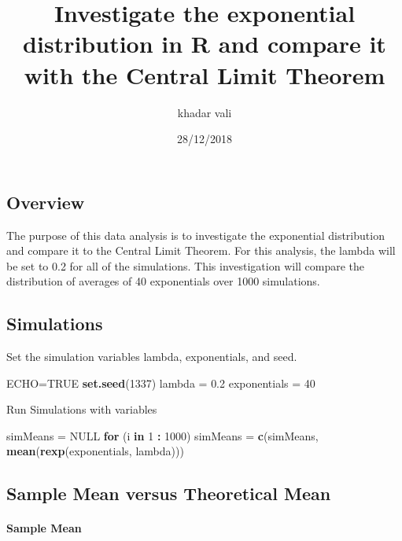 \documentclass[]{article}
\title{Investigate the exponential distribution in R and compare it with the
Central Limit Theorem}
\author{khadar vali}
\date{28/12/2018}
\newenvironment{Shaded}{\begin{snugshade}}{\end{snugshade}}
\newcommand{\KeywordTok}[1]{\textcolor[rgb]{0.13,0.29,0.53}{\textbf{#1}}}
\newcommand{\DecValTok}[1]{\textcolor[rgb]{0.00,0.00,0.81}{#1}}
\newcommand{\FloatTok}[1]{\textcolor[rgb]{0.00,0.00,0.81}{#1}}
\newcommand{\StringTok}[1]{\textcolor[rgb]{0.31,0.60,0.02}{#1}}
\newcommand{\OtherTok}[1]{\textcolor[rgb]{0.56,0.35,0.01}{#1}}
\newcommand{\ControlFlowTok}[1]{\textcolor[rgb]{0.13,0.29,0.53}{\textbf{#1}}}
\newcommand{\OperatorTok}[1]{\textcolor[rgb]{0.81,0.36,0.00}{\textbf{#1}}}
\newcommand{\NormalTok}[1]{#1}
\let\oldparagraph\paragraph
\renewcommand{\paragraph}[1]{\oldparagraph{#1}\mbox{}}
\begin{document}
\maketitle

\subsection{Overview}\label{overview}

The purpose of this data analysis is to investigate the exponential
distribution and compare it to the Central Limit Theorem. For this
analysis, the lambda will be set to 0.2 for all of the simulations. This
investigation will compare the distribution of averages of 40
exponentials over 1000 simulations.

\subsection{Simulations}\label{simulations}

Set the simulation variables lambda, exponentials, and seed.

\begin{Shaded}
\begin{Highlighting}[]
\NormalTok{ECHO=}\OtherTok{TRUE}
\KeywordTok{set.seed}\NormalTok{(}\DecValTok{1337}\NormalTok{)}
\NormalTok{lambda =}\StringTok{ }\FloatTok{0.2}
\NormalTok{exponentials =}\StringTok{ }\DecValTok{40}
\end{Highlighting}
\end{Shaded}

Run Simulations with variables

\begin{Shaded}
\begin{Highlighting}[]
\NormalTok{simMeans =}\StringTok{ }\OtherTok{NULL}
\ControlFlowTok{for}\NormalTok{ (i }\ControlFlowTok{in} \DecValTok{1} \OperatorTok{:}\StringTok{ }\DecValTok{1000}\NormalTok{) simMeans =}\StringTok{ }\KeywordTok{c}\NormalTok{(simMeans, }\KeywordTok{mean}\NormalTok{(}\KeywordTok{rexp}\NormalTok{(exponentials, lambda)))}
\end{Highlighting}
\end{Shaded}

\subsection{Sample Mean versus Theoretical
Mean}\label{sample-mean-versus-theoretical-mean}

\paragraph{Sample Mean}\label{sample-mean}
\end{document}
